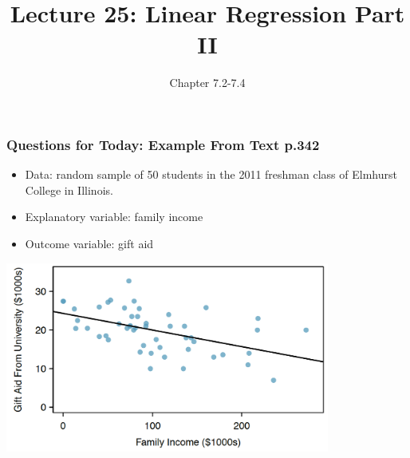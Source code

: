\documentclass[handout]{beamer}
\title{Lecture 25: Linear Regression Part II}
\author{Chapter 7.2-7.4}
\date{}
\newcommand{\blue}[1]{\textcolor{blue2}{#1}}
\begin{document}
\begin{frame}
\titlepage
\end{frame}


%
%
%
%
%
%
%
%



\begin{frame}[fragile]
\frametitle{Questions for Today: Example From Text p.342}
\begin{itemize}
\item Data: random sample of 50 students in the 2011 freshman class of Elmhurst College in Illinois.
\pause\item Explanatory variable: family income
\pause\item Outcome variable: gift aid
\end{itemize}

\begin{center}
\includegraphics[width=0.8\textwidth]{figure/regression.png}
\end{center}

\end{frame}
\end{document}
